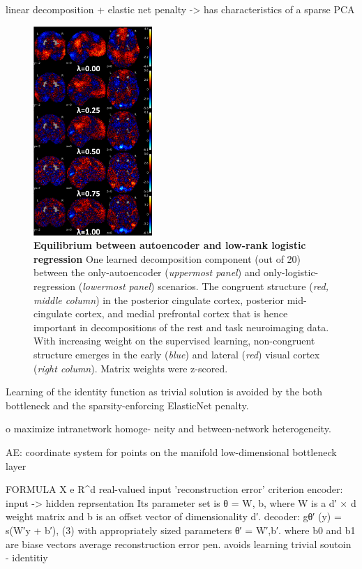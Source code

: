 \documentclass{article} %
\begin{document}
linear decomposition + elastic net penalty -> has characteristics of a
sparse PCA
\begin{figure}
  \begin{center}
    \includegraphics[width=0.40\textwidth]{figures/figure3.png}
  \end{center}
  \caption {\textbf{Equilibrium between autoencoder and low-rank logistic regression}
  One learned decomposition component (out of 20) between the only-autoencoder
  (\textit{uppermost panel}) and only-logistic-regression
  (\textit{lowermost panel}) scenarios.
  The congruent structure (\textit{red, middle column})
  in the
  posterior cingulate cortex, posterior mid-cingulate cortex, and medial
  prefrontal cortex that is hence important in decompositions of the rest and
  task neuroimaging data. With increasing weight on the supervised learning,
  non-congruent structure emerges in the early (\textit{blue}) and
  lateral (\textit{red}) visual cortex
  (\textit{right column}). Matrix weights were z-scored.
  }
\end{figure}

Learning of the identity function as trivial solution is avoided by
the both bottleneck and the sparsity-enforcing ElasticNet penalty.

o maximize intranetwork homoge- neity and between-network heterogeneity. 


AE:
coordinate system for points on the manifold
low-dimensional bottleneck layer

FORMULA
X e R^d real-valued input
'reconstruction error' criterion
encoder: input -> hidden reprsentation
Its parameter set is θ = {W, b}, where W is a d′ × d weight matrix and b is an offset vector of dimensionality d′.
decoder: gθ′ (y) = s(W′y + b′), (3)
with appropriately sized parameters θ′ = {W′,b′}.
where b0 and b1 are biase vectors
average reconstruction error
pen. avoids learning trivial soutoin - identitiy
\end{document}

